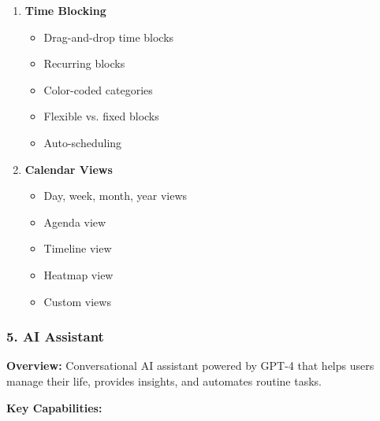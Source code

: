 \begin{enumerate}
    \item \textbf{Time Blocking}
    \begin{itemize}
        \item Drag-and-drop time blocks
        \item Recurring blocks
        \item Color-coded categories
        \item Flexible vs. fixed blocks
        \item Auto-scheduling
    \end{itemize}
    
    \item \textbf{Calendar Views}
    \begin{itemize}
        \item Day, week, month, year views
        \item Agenda view
        \item Timeline view
        \item Heatmap view
        \item Custom views
    \end{itemize}
\end{enumerate}

\subsubsection{5. AI Assistant}

\textbf{Overview:}
Conversational AI assistant powered by GPT-4 that helps users manage their life, provides insights, and automates routine tasks.

\textbf{Key Capabilities:}

